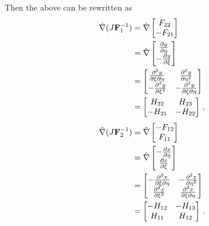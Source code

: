 \documentclass[../doc.tex]{subfiles}
\begin{document}
Then the above can be rewritten as 
	\begin{equation}
	\begin{aligned}
		\hat{\nabla}(J\boldsymbol{\mathrm{F}}_1^{-1}) &= \hat{\nabla} \begin{bmatrix} 
			F_{22} \\ -F_{21} 
		\end{bmatrix} \\
		&= \hat{\nabla}\begin{bmatrix} 
			\frac{\partial y}{\partial \eta} \\ -\frac{\partial y}{\partial \xi} 
		\end{bmatrix}\\
		&= \begin{bmatrix} 
			\frac{\partial^2 y}{\partial\xi\partial\eta} & \frac{\partial^2 y}{\partial\eta^2} \\ 
			-\frac{\partial^2 y}{\partial\xi^2} & -\frac{\partial^2 y}{\partial\xi\partial\eta} 
		\end{bmatrix}\\
		&= \begin{bmatrix} 
			H_{22} & H_{23} \\ -H_{21} & -H_{22}
		\end{bmatrix} \,, 
	\end{aligned}
	\end{equation}
	\begin{equation}
	\begin{aligned}
		\hat{\nabla}(J\boldsymbol{\mathrm{F}}_2^{-1}) &= \hat{\nabla} \begin{bmatrix} 
			-F_{12} \\ F_{11} 
		\end{bmatrix} \\
		&= \hat{\nabla}\begin{bmatrix} 
			-\frac{\partial x}{\partial \eta} \\ \frac{\partial x}{\partial \xi} 
		\end{bmatrix}\\
		&= \begin{bmatrix} 
			-\frac{\partial^2 x}{\partial\xi\partial\eta} & -\frac{\partial^2 x}{\partial\eta^2} \\ 
			\frac{\partial^2 x}{\partial\xi^2} & \frac{\partial^2 x}{\partial\xi\partial\eta} 
		\end{bmatrix}\\
		&= \begin{bmatrix} 
			-H_{12} & -H_{13} \\ H_{11} & H_{12} 
		\end{bmatrix} \,. 
	\end{aligned}
	\end{equation}
\end{document}
